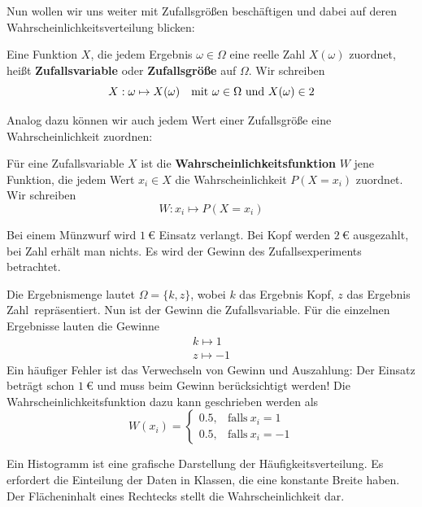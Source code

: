 \documentclass[ngerman, 12pt]{nssheetxea}
\begin{document}
Nun wollen wir uns weiter mit Zufallsgrößen beschäftigen und dabei auf deren Wahrscheinlichkeitsverteilung blicken:

\begin{definition}
Eine Funktion $X$, die jedem Ergebnis $\omega \in \Omega$ eine reelle Zahl $X(\omega)$ zuordnet, heißt \textbf{Zufallsvariable} oder \textbf{Zufallsgröße} auf $\Omega$. Wir schreiben
\[ X:\omega \mapsto X(\omega) \quad \text{mit} \ \omega \in \Omega \ \text{und} \ X(\omega) \in 2  \]
\end{definition}

Analog dazu können wir auch jedem Wert einer Zufallsgröße eine Wahrscheinlichkeit zuordnen:

\begin{definition}
Für eine Zufallsvariable $X$ ist die \textbf{Wahrscheinlichkeitsfunktion} $W$ jene Funktion, die jedem Wert $x_i \in X$ die Wahrscheinlichkeit $P(X=x_i)$ zuordnet. Wir schreiben
\[ W:x_i \mapsto P(X=x_i)  \]
\end{definition}

\begin{example}
Bei einem Münzwurf wird $\SI{1}{\euro}$ Einsatz verlangt. Bei Kopf werden $\SI{2}{\euro}$ ausgezahlt, bei Zahl erhält man nichts. Es wird der Gewinn des Zufallsexperiments betrachtet. \par
Die Ergebnismenge lautet $\Omega=\{k,z\}$, wobei $k$ das Ergebnis \glqq Kopf\grqq, $z$ das Ergebnis \glqq Zahl\grqq \ repräsentiert. Nun ist der Gewinn die Zufallsvariable. Für die einzelnen Ergebnisse lauten die Gewinne
\begin{align*}
k \mapsto 1 \\
z \mapsto -1
\end{align*}
Ein häufiger Fehler ist das Verwechseln von Gewinn und Auszahlung: Der Einsatz beträgt schon $\SI{1}{\euro}$ und muss beim Gewinn berücksichtigt werden! Die Wahrscheinlichkeitsfunktion dazu kann geschrieben werden als
\[ W(x_i) = \begin{cases} \num{0,5}, & \text{falls} \ x_i=1 \\ \num{0,5}, & \text{falls} \ x_i=-1  \end{cases}\]
\end{example}

\begin{definition}
Ein Histogramm ist eine grafische Darstellung der Häufigkeitsverteilung. Es erfordert die Einteilung der Daten in Klassen, die eine konstante Breite haben. Der Flächeninhalt eines Rechtecks stellt die Wahrscheinlichkeit dar.
\end{definition}
\end{document}
